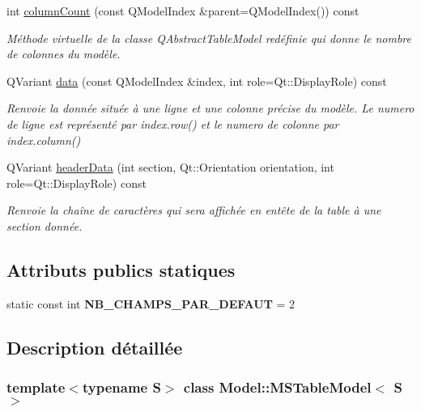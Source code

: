 \begin{DoxyCompactItemize}
int \hyperlink{class_model_1_1_m_s_table_model_a1596316183a5ace9d74199da67d49ba5}{columnCount} (const QModelIndex \&parent=QModelIndex()) const 
\begin{DoxyCompactList}\small\item\em Méthode virtuelle de la classe QAbstractTableModel redéfinie qui donne le nombre de colonnes du modèle. \item\end{DoxyCompactList}\item 
QVariant \hyperlink{class_model_1_1_m_s_table_model_ac32ed05114cd690b6b01bd0e4125c3dd}{data} (const QModelIndex \&index, int role=Qt::DisplayRole) const 
\begin{DoxyCompactList}\small\item\em Renvoie la donnée située à une ligne et une colonne précise du modèle. Le numero de ligne est représenté par index.row() et le numero de colonne par index.column() \item\end{DoxyCompactList}\item 
QVariant \hyperlink{class_model_1_1_m_s_table_model_a381ab9cc46824ee8073e6a2989c1a314}{headerData} (int section, Qt::Orientation orientation, int role=Qt::DisplayRole) const 
\begin{DoxyCompactList}\small\item\em Renvoie la chaîne de caractères qui sera affichée en entête de la table à une section donnée. \item\end{DoxyCompactList}\end{DoxyCompactItemize}
\subsection*{Attributs publics statiques}
\begin{DoxyCompactItemize}
\item 
\hypertarget{class_model_1_1_m_s_table_model_aaa19a5fe7e969dcd93024d59ab912ceb}{
static const int {\bfseries NB\_\-CHAMPS\_\-PAR\_\-DEFAUT} = 2}
\label{dd/df1/class_model_1_1_m_s_table_model_aaa19a5fe7e969dcd93024d59ab912ceb}

\end{DoxyCompactItemize}


\subsection{Description détaillée}
\subsubsection*{template$<$typename S$>$ class Model::MSTableModel$<$ S $>$}

